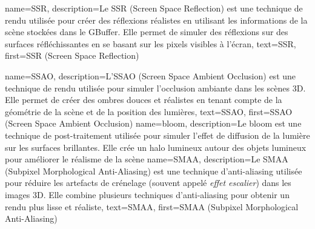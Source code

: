 {
    name=SSR,
    description={Le SSR (Screen Space Reflection) est une technique de rendu
    utilisée pour créer des réflexions réalistes en utilisant les
    informations de la scène stockées dans le \gls{GBuffer}. Elle permet de
    simuler des réflexions sur des surfaces réfléchissantes en se basant
    sur les pixels visibles à l'écran},
    text={SSR},
    first={SSR (Screen Space Reflection)}
}

{
    name=SSAO,
    description={L'SSAO (Screen Space Ambient Occlusion) est une technique de
    rendu utilisée pour simuler l'occlusion ambiante dans les scènes 3D. Elle
    permet de créer des ombres douces et réalistes en tenant compte de la
    géométrie de la scène et de la position des lumières},
    text={SSAO},
    first={SSAO (Screen Space Ambient Occlusion)}
}
{
    name=bloom,
    description={Le bloom est une technique de post-traitement utilisée pour
    simuler l'effet de diffusion de la lumière sur les surfaces brillantes.
    Elle crée un halo lumineux autour des objets lumineux pour améliorer le
    réalisme de la scène}
}
{
    name=SMAA,
    description={Le SMAA (Subpixel Morphological Anti-Aliasing) est une
    technique d'anti-aliasing utilisée pour réduire les artefacts de
    crénelage (souvent appelé \emph{effet escalier}) dans les images 3D. Elle combine plusieurs techniques
    d'anti-aliasing pour obtenir un rendu plus lisse et réaliste},
    text={SMAA},
    first={SMAA (Subpixel Morphological Anti-Aliasing)}
}

